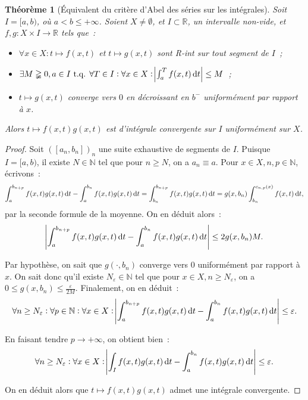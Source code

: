 \documentclass{report}
\newtheorem{thm}{Théorème}[chapter]
\theoremstyle{definition}
\theoremstyle{remark}
\numberwithin{equation}{section}
\newcommand{\R}{\mathbb R}
\newcommand{\N}{\mathbb N}
\newcommand{\tq}{\text{ t.q. }}
\newcommand{\pinfty}{{+\infty}}
\begin{document}
			\begin{thm}[Équivalent du critère d'Abel des séries sur les intégrales] Soit $I = [a, b)$, où $a < b \leq \pinfty$. Soient $X \neq \emptyset$, et
			$I \subset \R$, un intervalle non-vide, et $f, g : X \times I \to \R$ tels que~:
			\begin{itemize}
				\item $\forall x \in X : t \mapsto f(x, t)$ et $t \mapsto g(x, t)$ sont R-int sur tout segment de $I$~;
				\item $\exists M \gneqq 0, a \in I \tq \forall T \in I : \forall x \in X : \abs {\int_a^T f(x, t)\dif t} \leq M$~;
				\item $t \mapsto g(x, t)$ converge vers $0$ en décroissant en $b^-$ uniformément par rapport à $x$.
			\end{itemize}

			Alors $t \mapsto f(x, t)g(x, t)$ est d'intégrale convergente sur $I$ uniformément sur $X$.
			\end{thm}

			\begin{proof} Soit $([a_n, b_n])_n$ une suite exhaustive de segments de $I$. Puisque $I = [a, b)$, il existe $N \in \N$ tel que pour $n \geq N$, on
			a $a_n \equiv a$. Pour $x \in X, n, p \in \N$, écrivons~:
			\begin{equation}
				\int_a^{b_{n+p}}f(x, t)g(x, t)\dif t - \int_a^{b_n}f(x, t)g(x, t)\dif t = \int_{b_n}^{b_{n+p}}f(x, t)g(x, t)\dif t
				= g(x, b_n)\int_{b_n}^{c_{n, p}(x)}f(x, t)\dif t,
			\end{equation}
			par la seconde formule de la moyenne. On en déduit alors~:
			\begin{equation}
				\abs {\int_a^{b_{n+p}}f(x, t)g(x, t)\dif t - \int_a^{b_n}f(x, t)g(x, t)\dif t} \leq 2g(x, b_n)M.
			\end{equation}

			Par hypothèse, on sait que $g(\cdot, b_n)$ converge vers $0$ uniformément par rapport à $x$. On sait donc qu'il existe $N_\varepsilon \in \N$
			tel que pour $x \in X, n \geq N_\varepsilon$, on a $0 \leq g(x, b_n) \leq \frac \varepsilon{2M}$. Finalement, on en déduit~:
			\begin{equation}
				\forall n \geq N_\varepsilon : \forall p \in \N : \forall x \in X : \abs {\int_a^{b_{n+p}}f(x, t)g(x, t)\dif t - \int_a^{b_n}f(x, t)g(x, t)\dif t}
				\leq \varepsilon.
			\end{equation}

			En faisant tendre $p \to \pinfty$, on obtient bien~:
			\begin{equation}
				\forall n \geq N_\varepsilon : \forall x \in X : \abs {\int_If(x, t)g(x, t)\dif t - \int_a^{b_n}f(x, t)g(x, t)\dif t} \leq \varepsilon.
			\end{equation}

			On en déduit alors que $t \mapsto f(x, t)g(x, t)$ admet une intégrale convergente.
			\end{proof}
\end{document}
